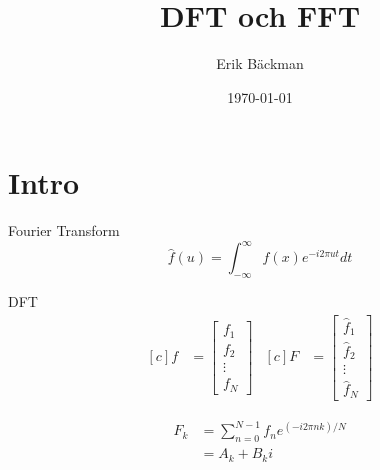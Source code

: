 \documentclass[presentation]{beamer}
\author{Erik Bäckman}
\date{\today}
\title{DFT och FFT}
\begin{document}
\maketitle
\section{Intro}
\label{sec:orgaac504a}

\begin{frame}[label={sec:org030ed15}]{Fourier Transform}
\[ \hat{f}(u) = \int_{-\infty}^{\infty} f(x)e^{-i2 \pi ut}dt \]
\end{frame}

\begin{frame}[label={sec:orge65f619}]{DFT}
\begin{equation*}
\begin{aligned}[c]
f &=
  \begin{bmatrix}
    f_{1} \\
    f_{2} \\
    \vdots \\
    f_{N}
    \end{bmatrix}
\end{aligned}
\begin{aligned}[c]
F &=
  \begin{bmatrix}
    \hat{f}_{1} \\
    \hat{f}_{2} \\
    \vdots \\
    \hat{f}_{N}
    \end{bmatrix}
\end{aligned}
\end{equation*}

\begin{align*}
F_{k} &= \sum_{n=0}^{N-1} f_{n} e^{(-i2 \pi nk)/N} \\
      &= A_{k} + B_{k}i
\end{align*}
\end{frame}
\end{document}
